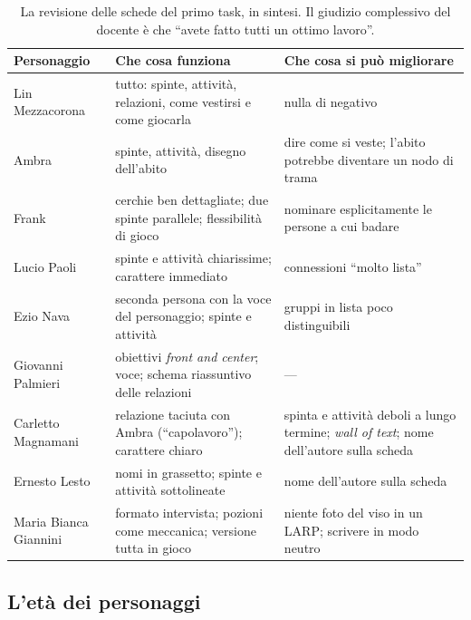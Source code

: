 \begin{table}[htbp]
\centering
\small
\begin{tabular}{@{}p{2.6cm}p{5.2cm}p{5.4cm}@{}}
\toprule
\textbf{Personaggio} & \textbf{Che cosa funziona} & \textbf{Che cosa si può
migliorare} \\
\midrule
Lin Mezzacorona & tutto: spinte, attività, relazioni, come vestirsi e come
giocarla & nulla di negativo \\
Ambra & spinte, attività, disegno dell'abito & dire come si veste; l'abito
potrebbe diventare un nodo di trama \\
Frank & cerchie ben dettagliate; due spinte parallele; flessibilità di gioco &
nominare esplicitamente le persone a cui badare \\
Lucio Paoli & spinte e attività chiarissime; carattere immediato & connessioni
``molto lista'' \\
Ezio Nava & seconda persona con la voce del personaggio; spinte e attività &
gruppi in lista poco distinguibili \\
Giovanni Palmieri & obiettivi \emph{front and center}; voce; schema riassuntivo
delle relazioni & --- \\
Carletto Magnamani & relazione taciuta con Ambra (``capolavoro''); carattere
chiaro & spinta e attività deboli a lungo termine; \emph{wall of text}; nome
dell'autore sulla scheda \\
Ernesto Lesto & nomi in grassetto; spinte e attività sottolineate & nome
dell'autore sulla scheda \\
Maria Bianca Giannini & formato intervista; pozioni come meccanica; versione
tutta in gioco & niente foto del viso in un LARP; scrivere in modo neutro \\
\bottomrule
\end{tabular}
\caption{La revisione delle schede del primo task, in sintesi. Il giudizio
complessivo del docente è che ``avete fatto tutti un ottimo lavoro''.}
\label{a5:tab:schede}
\end{table}

\subsection{L'età dei personaggi}

